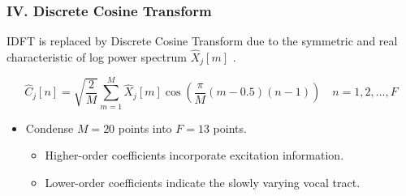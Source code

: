 
\begin{frame}
\frametitle{IV. Discrete Cosine Transform}
IDFT is replaced by Discrete Cosine Transform due to the symmetric and real characteristic of log power spectrum $\hat{X}_j[m]$ \cite{picone1993signal, iser2008bandwidth}.

\begin{equation}
\hat{C}_j[n] = \sqrt{\frac{2}{M}} \sum^{M}_{m=1} \hat{X}_j[m] \cos \left( \frac{\pi}{M} (m - 0.5) (n-1) \right) \quad n = 1, 2, \dots, F
\end{equation}

\begin{itemize}
	\item Condense $M = 20$ points into $F = 13$ points. \cite{tan2008automatic}
	\begin{itemize}
		\item Higher-order coefficients incorporate excitation information.
		\item Lower-order coefficients indicate the slowly varying vocal tract.
	\end{itemize}
\end{itemize}
\end{frame}
